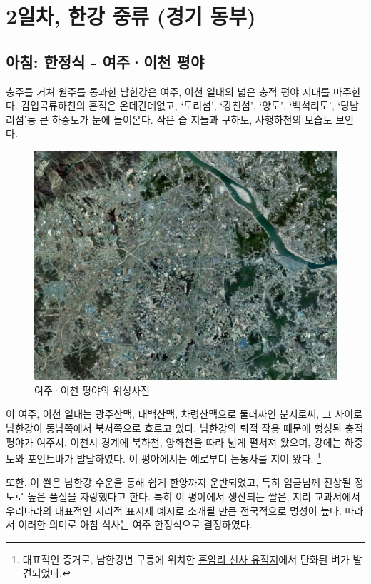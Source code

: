 \chapter{2일차, 한강 중류 (경기 동부)}
\section{아침: 한정식 - 여주·이천 평야}
충주를 거쳐 원주를 통과한 남한강은 여주, 이천 일대의 넓은 충적 평야 지대를 마주한다. 
감입곡류하천의 흔적은 온데간데없고, `도리섬', `강천섬', ‘양도’, ‘백석리도’, `당남리섬'등 큰 하중도가 눈에 들어온다.
작은 습 지들과 구하도, 사행하천의 모습도 보인다.

\begin{figure}[ht]
    \centering
    \includegraphics[width=.6\textwidth]{img/여주이천평야.jpg}
    \caption{여주·이천 평야의 위성사진\protect\footnotemark}
    \label{fig:my_label}
\end{figure}


이 여주, 이천 일대는 
광주산맥, 태백산맥, 차령산맥으로 둘러싸인 분지로써,
그 사이로 남한강이 동남쪽에서 북서쪽으로 흐르고 있다.
남한강의 퇴적 작용 때문에 형성된 충적평야가 여주시, 이천시 경계에 북하천, 양화천을 따라 넓게 펼쳐져 왔으며,
강에는 하중도와 포인트바가 발달하였다.
이 평야에서는 예로부터 논농사를 지어 왔다.
\footnote{대표적인 증거로, 남한강변 구릉에 위치한 \href{https://terms.naver.com/entry.naver?docId=1793906&cid=49217&categoryId=49217}{혼암리 선사 유적지}에서 탄화된 벼가 발견되었다.}


또한, 이 쌀은 남한강 수운을 통해 쉽게 한양까지 운반되었고, 특히 임금님께 진상될 정도로 높은 품질을 자랑했다고 한다.
특히 이 평야에서 생산되는 쌀은, 지리 교과서에서 우리나라의 대표적인 지리적 표시제 예시로 소개될 만큼 전국적으로 명성이 높다.
따라서 이러한 의미로 아침 식사는 여주 한정식으로 결정하였다.
 

